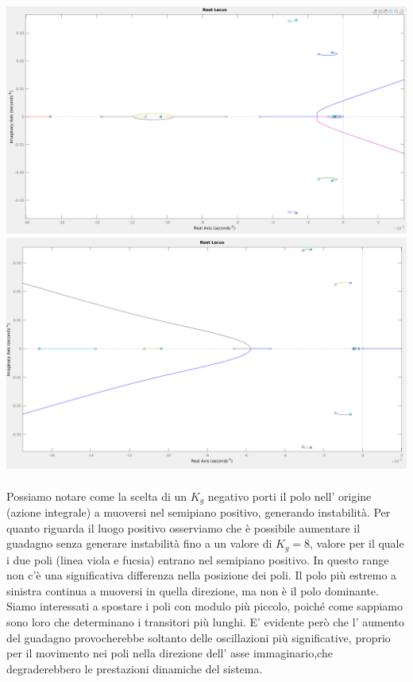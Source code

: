 \documentclass[Lau,noexaminfo]{sapthesis}
\begin{document}
	\includegraphics[scale=0.27]{rlocus_P2_pos}\\
	\includegraphics[scale=0.27]{rlocus_P2_neg}\\\\
	Possiamo notare come la scelta di un $K_g$ negativo porti il polo nell' origine (azione integrale) a muoversi nel semipiano positivo, generando instabilità. Per quanto riguarda il luogo positivo osserviamo che è possibile aumentare il guadagno senza generare instabilità fino a un valore di $K_g=8$, valore per il quale i due poli (linea viola e fucsia) entrano nel semipiano positivo. In questo range non c'è una significativa differenza nella posizione dei poli. Il polo più estremo a sinistra continua a muoversi in quella direzione, ma non è il polo dominante. Siamo interessati a spostare i poli con modulo più piccolo, poiché come sappiamo sono loro che determinano i transitori più lunghi. E' evidente però che l' aumento del guadagno provocherebbe soltanto delle oscillazioni più significative, proprio per il movimento nei poli nella direzione dell' asse immaginario,che degraderebbero le prestazioni dinamiche del sistema.
\end{document}
